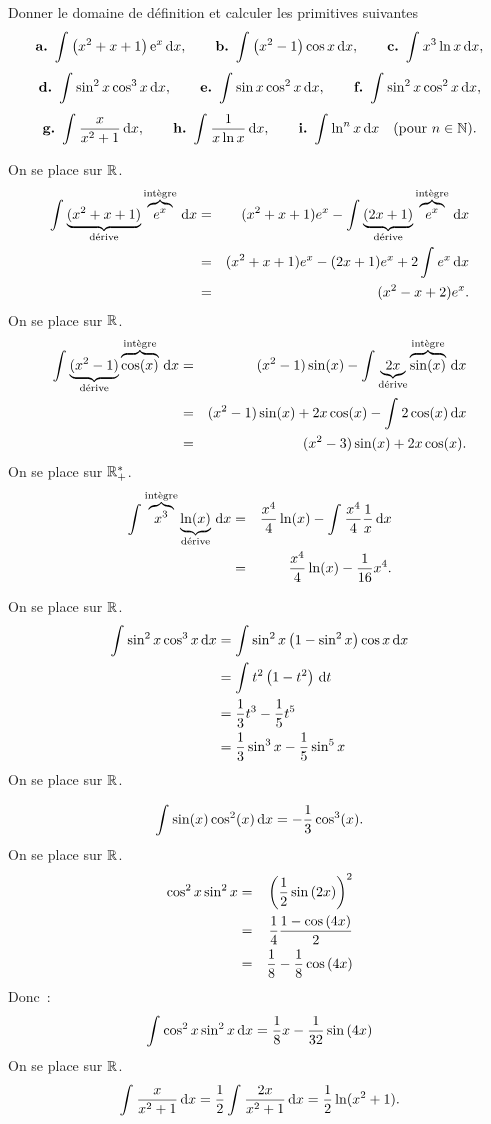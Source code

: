 \documentclass{magnolia}
\begin{document}
Donner le domaine de définition et calculer les primitives suivantes
\[\textbf{a.}\ \int_{}^{} \left(x^2+x+1\right){\rm e}^x\,\text{d}x, \qquad \textbf{b.}\ \int_{}^{} \left(x^2-1\right)\cos x\,\text{d}x, \qquad
\textbf{c.}\ \int_{}^{} x^3\ln x\,\text{d}x,\]
\[\textbf{d.}\ \int_{}^{} \sin^2 x\cos^3 x\,\text{d}x, \qquad \textbf{e.}\ \int_{}^{} \sin x\cos^2 x\,\text{d}x, \qquad
\textbf{f.}\ \int_{}^{} \sin^2 x\cos^2 x\,\text{d}x,\]
\[\textbf{g.}\ \int_{}^{} \frac{x}{x^2+1}\,\text{d}x, \qquad \textbf{h.}\ \int_{}^{} \frac{1}{x\ln x}\,\text{d}x, \qquad
\textbf{i.}\ \int_{}^{} \ln^n x\,\text{d}x \quad (\text{pour $n\in\mathbb{N}$}).\]


\begin{sol}
\begin{questions}
\question On se place sur $\mathbb{R}$.
\begin{eqnarray*}
\int_{}^{} \underbrace{(x^2+x+1)}_{\text{d\'erive}} \overbrace{e^x}^{\text{int\`egre}}\,\text{d}x&=&(x^2+x+1)e^x-\int_{}^{} \underbrace{(2x+1)}_{\text{d\'erive}} \overbrace{e^x}^{\text{int\`egre}}\,\text{d}x\\
&=&(x^2+x+1)e^x-(2x+1)e^x+2\int_{}^{} e^x\,\text{d}x\\
&=&(x^2-x+2)e^x .
\end{eqnarray*}
\question On se place sur $\mathbb{R}$.
\begin{eqnarray*}
\int_{}^{} \underbrace{(x^2-1)}_{\text{d\'erive}} \overbrace{\cos(x)}^{\text{int\`egre}}\,\text{d}x&=&(x^2-1)\sin(x)-\int_{}^{} \underbrace{2x}_{\text{d\'erive}} \overbrace{\sin(x)}^{\text{int\`egre}}\,\text{d}x\\
&=&(x^2-1)\sin(x)+2x\cos(x)-\int_{}^{} 2\cos(x)\,\text{d}x\\
&=&(x^2-3)\sin(x)+2x\cos(x).
\end{eqnarray*}
\question On se place sur $\mathbb{R}_+^*$.
\begin{eqnarray*}
\int_{}^{} \overbrace{x^3}^{\text{int\`egre}} \underbrace{\ln(x)}_{\text{d\'erive}}\,\text{d}x&=&\frac{x^4}{4}\ln(x)-\int_{}^{} \frac{x^4}{4}\frac{1}{x}\,\text{d}x\\
&=&\frac{x^4}{4}\ln(x)-\frac{1}{16}x^4.
\end{eqnarray*}

\question On se place sur $\mathbb{R}$.
\begin{equation*}
    \begin{split}
    \int_{}^{} \sin^2 x\cos^3 x\,\text{d}x&=\int_{}^{} \sin^2 x \left(1-\sin^2 x\right)\cos x\,\text{d}x\\
                              &=\int_{}^{} t^2\left(1-t^2\right)\,\text{d}t\\
                              &=\frac{1}{3}t^3-\frac{1}{5}t^5\\
                              &=\frac{1}{3}\sin^3 x-\frac{1}{5}\sin^5 x\\
    \end{split}
    \end{equation*}    
\question On se place sur $\mathbb{R}$.

$$\int_{}^{} \sin(x)\cos^2(x)\,\text{d}x=-\frac{1}{3}\cos^3(x).$$
\question On se place sur $\mathbb{R}$.
    \begin{eqnarray*}
    \cos^2 x\sin^2 x&=&\left(\frac{1}{2}\sin\left(2x\right)\right)^2\\
     &=&\frac{1}{4}\frac{1-\cos\left(4x\right)}{2}\\
     &=&\frac{1}{8}-\frac{1}{8}\cos\left(4x\right)
    \end{eqnarray*}
    Donc~:
    $$\int_{}^{} \cos^2 x\sin^2 x\,\text{d}x=\frac{1}{8}x-\frac{1}{32}\sin\left(4x\right)$$
\question On se place sur $\mathbb{R}$.
$$\int_{}^{} \frac{x}{x^2+1}\,\text{d}x=\frac{1}{2}\int_{}^{} \frac{2x}{x^2+1}\,\text{d}x=\frac{1}{2}\ln(x^2+1).$$


\end{questions}
\end{sol}
\end{document}
